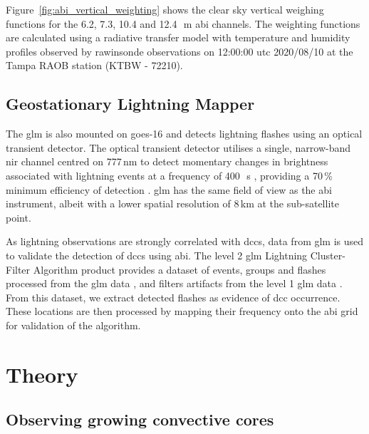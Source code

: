 Figure~\ref{fig:abi_vertical_weighting} shows the clear sky vertical weighing functions for the 6.2, 7.3, 10.4 and 12.4\,\unit{\mu m} \acrshort{abi} channels.
The weighting functions are calculated using a radiative transfer model with temperature and humidity profiles observed by rawinsonde observations on 12:00:00 \acrshort{utc} 2020/08/10 at the Tampa RAOB station (KTBW - 72210). 



\subsection{Geostationary Lightning Mapper}

The \acrshort{glm} is also mounted on \acrshort{goes}-16 and detects lightning flashes using an optical transient detector.
The optical transient detector utilises a single, narrow-band \acrshort{nir} channel centred on 777\,\unit{nm} \citep{orville_absolute_1984} to detect momentary changes in brightness associated with lightning events at a frequency of 400\,\unit{\mu s} \citep{christian_global_2003}, providing a 70\,\% minimum efficiency of detection \citep{goodman_goes-r_2013}.
\acrshort{glm} has the same field of view as the \acrshort{abi} instrument, albeit with a lower spatial resolution of 8\,\unit{km} at the sub-satellite point.

As lightning observations are strongly correlated with \acrshort{dcc}s, data from \acrshort{glm} is used to validate the detection of \acrshort{dcc}s using \acrshort{abi}.
The level 2 \acrshort{glm} Lightning Cluster-Filter Algorithm product provides a dataset of events, groups and flashes processed from the \acrshort{glm} data \citep{peterson_research_2019}, and filters artifacts from the level 1 \acrshort{glm} data \citep{peterson_removing_2020}.
From this dataset, we extract detected flashes as evidence of \acrshort{dcc} occurrence.
These locations are then processed by mapping their frequency onto the \acrshort{abi} grid for validation of the algorithm.


\section{Theory}

\subsection{Observing growing convective cores}

